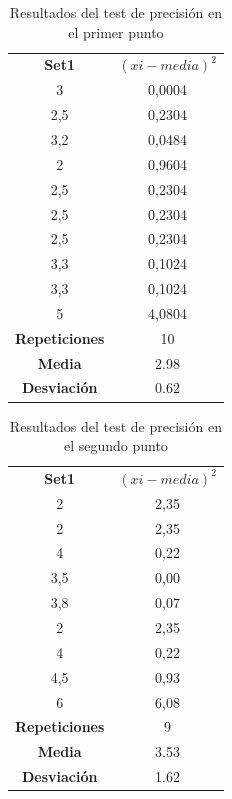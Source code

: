 	
		\begin{table}[htbp]
		\centering
		\caption{Resultados del test de precisión en el primer punto}
		\label{tab:resultados_precision1}
		\begin{center}
			\begin{tabular}{|c|c|}
				\hline
				\textbf{Set1} & \textbf{$(xi-media)^2$}  \\
				3	&0,0004 \\
				2,5 &	0,2304 \\
				3,2&	0,0484 \\
				2	&0,9604 \\
				2,5&	0,2304 \\
				2,5	&0,2304 \\
				2,5	&0,2304 \\
				3,3&	0,1024 \\
				3,3&	0,1024 \\
				5	&4,0804 \\
				\hline
				\hline
				\textbf{Repeticiones} & 10\\
				\textbf{Media} & 2.98\\
				\textbf{Desviación} & 0.62\\
			\end{tabular}
		\end{center}
	\end{table}
	
	
		\begin{table}[htbp]
		\centering
		\caption{Resultados del test de precisión en el segundo punto}
		\label{tab:resultados_precision2}
		\begin{center}
			\begin{tabular}{|c|c|}
				\hline
				\textbf{Set1} & \textbf{$(xi-media)^2$}  \\
				2 &	2,35 \\
				2 &	2,35 \\
				4 &	0,22 \\
				3,5 &	0,00 \\
				3,8 &	0,07 \\
				2 &	2,35 \\
				4 &	0,22 \\
				4,5 &	0,93 \\
				6 &	6,08 \\
				\hline
				\hline
				\textbf{Repeticiones} & 9\\
				\textbf{Media} & 3.53\\
				\textbf{Desviación} & 1.62\\
			\end{tabular}
		\end{center}
	\end{table}
